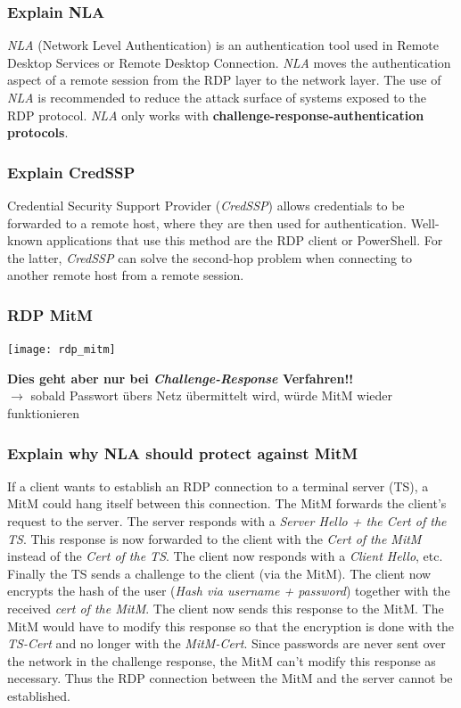 \subsubsection{Explain NLA}
\textit{NLA} (Network Level Authentication) is an authentication tool used in Remote Desktop Services or Remote Desktop Connection.
\textit{NLA} moves the authentication aspect of a remote session from the RDP layer to the network layer. The use of \textit{NLA} is recommended to reduce the attack surface of systems exposed to the RDP protocol.
\textit{NLA} only works with \textbf{challenge-response-authentication protocols}.
\subsubsection{Explain CredSSP}
Credential Security Support Provider (\textit{CredSSP}) allows credentials to be forwarded to a remote host, where they are then used for authentication. Well-known applications that use this method are the RDP client or PowerShell. For the latter, \textit{CredSSP} can solve the second-hop problem when connecting to another remote host from a remote session.
\subsubsection{RDP MitM}
\begin{center}
    \texttt{[image: rdp\_mitm]}
\end{center}
\textbf{Dies geht aber nur bei \textit{Challenge-Response} Verfahren!!}\\
$\rightarrow$ sobald Passwort übers Netz übermittelt wird, würde MitM wieder funktionieren
\subsubsection{Explain why NLA should protect against MitM}
If a client wants to establish an RDP connection to a terminal server (TS), a MitM could hang itself between this connection. The MitM forwards the client's request to the server. The server responds with a \textit{Server Hello + the Cert of the TS}. This response is now forwarded to the client with the \textit{Cert of the MitM} instead of the \textit{Cert of the TS}. The client now responds with a \textit{Client Hello}, etc.
Finally the TS sends a challenge to the client (via the MitM). The client now encrypts the hash of the user (\textit{Hash via username + password}) together with the received \textit{cert of the MitM}. The client now sends this response to the MitM. The MitM would have to modify this response so that the encryption is done with the \textit{TS-Cert} and no longer with the \textit{MitM-Cert}. Since passwords are never sent over the network in the challenge response, the MitM can't modify this response as necessary. Thus the RDP connection between the MitM and the server cannot be established.
